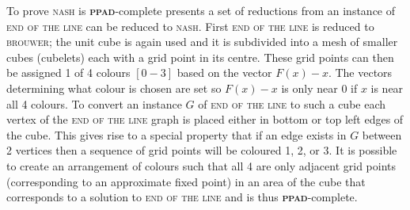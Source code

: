 \documentclass{article}
\begin{document}
To prove \textsc{nash} is \textbf{\textsc{ppad}}-complete \cite{Daskalakis.2009} presents a set of reductions from an instance of \textsc{end of the line} can be reduced to \textsc{nash}. First \textsc{end of the line} is reduced to \textsc{brouwer}; the unit cube is again used and it is subdivided into a mesh of smaller cubes (cubelets)  each with a grid point in its centre. These grid points can then be assigned 1 of 4 colours $[0-3]$ based on the vector $F(x)-x$. The vectors determining what colour is chosen are set so $F(x)-x$ is only near $0$ if $x$ is near all 4 colours. To convert an instance $G$ of \textsc{end of the line} to such a cube each vertex of the \textsc{end of the line} graph is placed either in bottom or top left edges of the cube. This gives rise to a special property that if an edge exists in $G$ between 2 vertices then a sequence of grid points will be coloured 1, 2, or 3. It is possible to create an arrangement of colours such that all 4 are only adjacent grid points (corresponding to an approximate fixed point) in an area of the cube that corresponds to a solution to \textsc{end of the line} and is thus \textbf{\textbf{\textsc{ppad}}}-complete.
\end{document}

